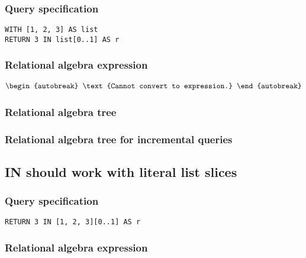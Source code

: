 \subsubsection*{Query specification}

\begin{lstlisting}
WITH [1, 2, 3] AS list
RETURN 3 IN list[0..1] AS r
\end{lstlisting}

\subsubsection*{Relational algebra expression}

\begin{align*}
\begin{autobreak}
\text{Cannot convert to expression.}
\end{autobreak}
\end{align*}

\subsubsection*{Relational algebra tree}


\subsubsection*{Relational algebra tree for incremental queries}


\subsection{IN should work with literal list slices}

\subsubsection*{Query specification}

\begin{lstlisting}
RETURN 3 IN [1, 2, 3][0..1] AS r
\end{lstlisting}

\subsubsection*{Relational algebra expression}

